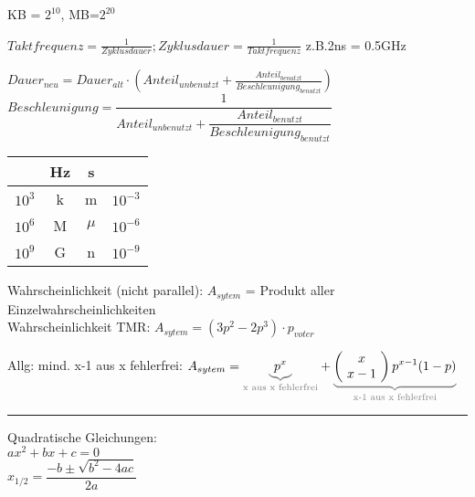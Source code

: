 \begin{minipage}{0.7\textwidth}

KB = $2^{10}$, MB=$2^{20}$

$Taktfrequenz 	= 	\frac{1}{Zyklusdauer};  	Zyklusdauer  	= 	\frac{1}{Taktfrequenz}$ z.B.2ns = 0.5GHz 

$	Dauer_{neu}  	= 	Dauer_{alt} \cdot \left( Anteil_{unbenutzt} 	+ \frac{Anteil_{benutzt}}{Beschleunigung_{benutzt}} \right)   $\\
$	Beschleunigung  = 	\dfrac{1}{Anteil_{unbenutzt} + \dfrac{Anteil_{benutzt}}{Beschleunigung_{benutzt}}}	$

\end{minipage}
\begin{minipage}{0.2\textwidth}
\begin{tabular}{c|c|c|c}
\hline
 &Hz & s \\
\hline
$10^3$ & k & m & $10^{-3}$ \\
\hline
$10^6$ &M & $\mu$ & $10^{-6}$ \\
\hline
$10^9$ &G  & n & $10^{-9}$ \\
\hline
\end{tabular}
\end{minipage}

\begin{minipage}{0.7\textwidth}
Wahrscheinlichkeit (nicht parallel):	$A_{sytem}$ 	= Produkt aller Einzelwahrscheinlichkeiten \\ 
Wahrscheinlichkeit TMR: $A_{sytem}	= (3p^2 - 2p^3) \cdot p_{voter}$

\newcommand{\note}[2]{\textcolor{gray}{\underbrace{\textcolor{black}{#2}}_{\text{#1}}}}

Allg: mind. x-1 aus x fehlerfrei: $A_{sytem}	= \note{x aus x fehlerfrei}{p^x} + \note{x-1 aus x fehlerfrei}{\left( \! \begin{array}{c} x \\ x-1 \end{array} \! \right) p^{x-1}(1-p)}$\\
\end{minipage}
\begin{minipage}{1pt} \rule{1pt}{5\baselineskip} \end{minipage} 
\begin{minipage}{0.3\textwidth}
Quadratische Gleichungen:\\
 $ax^2+bx+c=0$\\
\textbf{$x_{1/2} = \dfrac{-b \pm \sqrt{b^2-4ac}}{2a} $}
\end{minipage}

